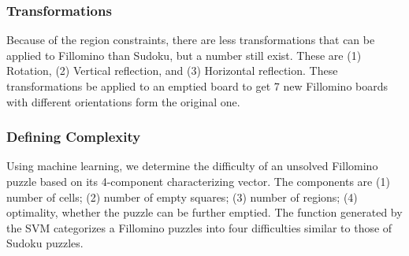 \subsubsection*{Transformations}
Because of the region constraints, there are less
transformations that can be applied to Fillomino than Sudoku, but a
number still exist. These are (1) Rotation, (2) Vertical reflection, and (3) Horizontal reflection. These transformations be applied to an emptied board to get 7 new Fillomino boards with different orientations form the original one.

\subsubsection*{Defining Complexity}
Using machine learning, we determine the difficulty of an unsolved
Fillomino puzzle based on its 4-component characterizing vector. The components are (1) number of cells; (2) number of empty squares; (3) number of regions; (4) optimality, whether the puzzle can be further emptied. The function generated by the SVM categorizes a Fillomino puzzles into four difficulties similar to those of Sudoku puzzles.

